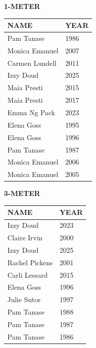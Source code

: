 \begin{table}[H]
\centering
\begin{minipage}[t]{0.6\textwidth}
\centering
\textbf{1-METER}\\[0.1cm]
\begin{tabular}{@{}p{2.8cm}p{1.2cm}@{}}
\hline
    \textbf{NAME} & \textbf{YEAR} \\
\hline
    Pam Tanase & 1986 \\
    Monica Emanuel & 2007 \\
    Carmen Lundell & 2011 \\
    Izzy Doud & 2025 \\
    Maia Presti & 2015 \\
    Maia Presti & 2017 \\
    Emma Ng Pack & 2023 \\
    Elena Goss & 1995 \\
    Elena Goss & 1996 \\
    Pam Tanase & 1987 \\
    Monica Emanuel & 2006 \\
    Monica Emanuel & 2005 \\
\hline
\end{tabular}
\end{minipage}
\end{table}

\begin{table}[H]
\centering
\begin{minipage}[t]{0.6\textwidth}
\centering
\textbf{3-METER}\\[0.1cm]
\begin{tabular}{@{}p{2.8cm}p{1.2cm}@{}}
\hline
    \textbf{NAME} & \textbf{YEAR} \\
\hline
    Izzy Doud & 2023 \\
    Claire Irvin & 2000 \\
    Izzy Doud & 2025 \\
    Rachel Pickens & 2001 \\
    Carli Lessard & 2015 \\
    Elena Goss & 1996 \\
    Julie Sutor & 1997 \\
    Pam Tanase & 1988 \\
    Pam Tanase & 1987 \\
    Pam Tanase & 1986 \\
\hline
\end{tabular}
\end{minipage}
\end{table}

